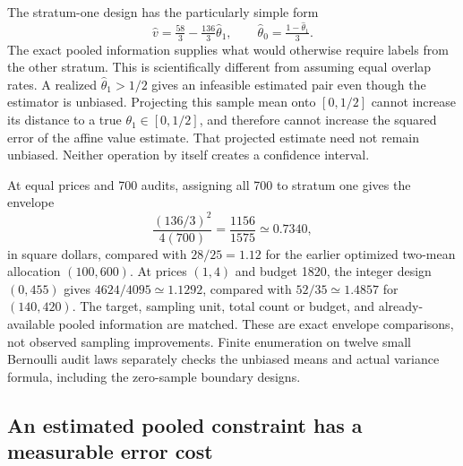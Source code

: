 The stratum-one design has the particularly simple form
\begin{equation}
 \widehat v=\tfrac{58}{3}-\tfrac{136}{3}\widehat\theta_1,
 \qquad
 \widehat\theta_0=\tfrac{1-\widehat\theta_1}{3}.
 \label{exec17:s7-one-stratum}
\end{equation}
The exact pooled information supplies what would otherwise require labels
from the other stratum. This is scientifically different from assuming equal
overlap rates. A realized $\widehat\theta_1>1/2$ gives an infeasible estimated
pair even though the estimator is unbiased. Projecting this sample mean onto
$[0,1/2]$ cannot increase its distance to a true $\theta_1\in[0,1/2]$, and
therefore cannot increase the squared error of the affine value estimate.
That projected estimate need not remain unbiased. Neither operation by itself
creates a confidence interval.

At equal prices and 700 audits, assigning all 700 to stratum one gives the
envelope
\begin{equation}
 \frac{(136/3)^2}{4(700)}=\frac{1156}{1575}\simeq0.7340,
 \label{exec17:s7-pooled-count-comparison}
\end{equation}
in square dollars, compared with $28/25=1.12$ for the earlier optimized
two-mean allocation $(100,600)$. At prices $(1,4)$ and budget 1820, the
integer design $(0,455)$ gives $4624/4095\simeq1.1292$, compared with
$52/35\simeq1.4857$ for $(140,420)$. The target, sampling unit, total count
or budget, and already-available pooled information are matched. These are
exact envelope comparisons, not observed sampling improvements. Finite
enumeration on twelve small Bernoulli audit laws separately checks the
unbiased means and actual variance formula, including the zero-sample boundary
designs.~\citep{exec17_s7_extension}

\subsection{An estimated pooled constraint has a measurable error cost}
\label{exec17:s7-noisy-pool}

